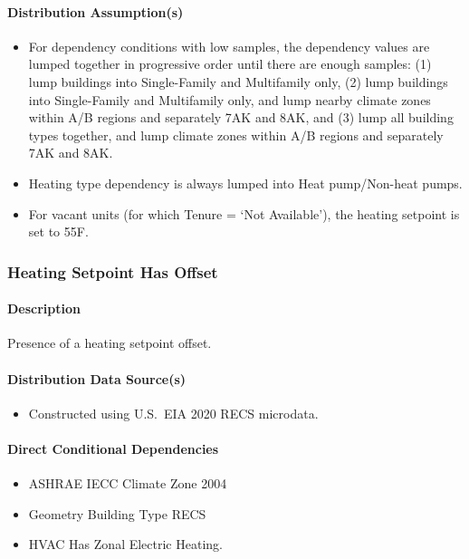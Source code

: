 \paragraph{Distribution Assumption(s)}
\begin{itemize}
    \item For dependency conditions with low samples, the dependency values are lumped together in progressive order until there are enough samples: (1) lump buildings into Single-Family and Multifamily only, (2) lump buildings into Single-Family and Multifamily only, and lump nearby climate zones within A/B regions and separately 7AK and 8AK, and (3) lump all building types together, and lump climate zones within A/B regions and separately 7AK and 8AK.
    \item Heating type dependency is always lumped into Heat pump/Non-heat pumps.
    \item For vacant units (for which Tenure = ‘Not Available’), the heating setpoint is set to 55\degree F.
\end{itemize}


\subsubsection{Heating Setpoint Has Offset}
\paragraph{Description}
Presence of a heating setpoint offset.

\paragraph{Distribution Data Source(s)}
\begin{itemize}
    \item Constructed using U.S.~EIA 2020 RECS microdata.
\end{itemize}

\paragraph{Direct Conditional Dependencies}
\begin{itemize}
    \item ASHRAE IECC Climate Zone 2004
    \item Geometry Building Type RECS
    \item HVAC Has Zonal Electric Heating.
\end{itemize}

